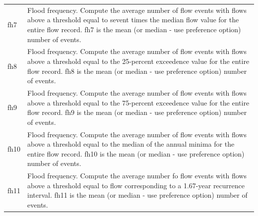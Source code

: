 \documentclass[a4paper,11pt]{article}\usepackage[]{graphicx}\usepackage[]{color}
\begin{document}
\begin{table}[ht]
\begin{threeparttable}[b]
\begin{tabularx}{\textwidth}{|l|X|}
  fh7 & Flood frequency. Compute the average number of flow events with flows above a threshold equal to sevent times the median flow value for the entire flow record. fh7 is the mean (or median - use preference option) number of events. \\
  fh8 & Flood frequency. Compute the average number of flow events with flows above a threshold equal to the 25-percent exceedence value for the entire flow record. fh8 is the mean (or median - use preference option) number of events. \\
  fh9 & Flood frequency. Compute the average number of flow events with flows above a threshold equal to the 75-percent exceedence value for the entire flow record. fh9 is the mean (or median - use preference option) number of events. \\
  fh10 & Flood frequency. Compute the average number of flow events with flows above a threshold equal to the median of the annual minima for the entire flow record. fh10 is the mean (or median - use preference option) number of events. \\
  fh11 & Flood frequency. Compute the average number fo flow events with flows above a threshold equal to flow corresponding to a 1.67-year recurrence interval. fh11 is the mean (or median - use preference option) number of events. \\
   \hline
\end{tabularx}
\end{threeparttable}
\end{table}
\end{document}
